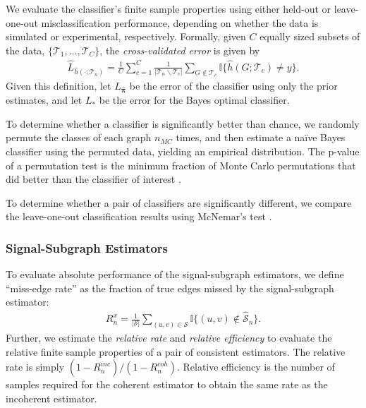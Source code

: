 \documentclass[10pt,journal,cspaper,compsoc]{IEEEtran}
\newcommand{\II}{\mathbb{I}}           %
\providecommand{\mc}[1]{\mathcal{#1}}
\providecommand{\wh}[1]{\widehat{#1}}
\providecommand{\mhc}[1]{\widehat{\mathcal{#1}}}
\providecommand{\mhb}[1]{\hat{\boldsymbol{#1}}}
\begin{document}
We evaluate the classifier's finite sample properties using either held-out or leave-one-out misclassification performance, depending on whether the data is simulated or experimental, respectively.  Formally, given $C$ equally sized subsets of the data, $\{\mc{T}_{1}, \ldots, \mc{T}_{C}\}$, the \emph{cross-validated error} is given by
\begin{align} \label{eq:L2}
	\wh{L}_{\wh{h}(\cdot; \mc{T}_n)} = \frac{1}{C}\sum_{c=1}^C \frac{1}{|\mc{T}_n \backslash \mc{T}_c|}\sum_{G \notin \mc{T}_c} \II\{\wh{h}(G; \mc{T}_{c}) \neq y\}.
\end{align}
Given this definition, let $L_{\mhb{\pi}}$ be the error of the classifier using only the prior estimates, and let $L_*$ be the error for the Bayes optimal classifier.  

To determine whether a classifier is significantly better than chance, we randomly permute the classes of each graph $n_{MC}$ times, and then estimate a na\"ive Bayes classifier using the permuted data, yielding an empirical distribution.  The p-value of a permutation test is the minimum fraction of Monte Carlo permutations that did better than the classifier of interest \cite{Good2010}.  

To determine whether a pair of classifiers are significantly different, we compare the leave-one-out classification results using McNemar's test \cite{McNemar1947}.


\subsubsection{Signal-Subgraph Estimators} %
\label{ssub:signal_subgraph_estimators}


To evaluate absolute performance of the signal-subgraph estimators, we define  ``miss-edge rate'' as the fraction of true edges missed by the signal-subgraph estimator:
\begin{align}
R^x_n = \frac{1}{|\mc{S}|} \sum_{(u,v)\in \mc{S}}\II\{(u,v) \notin \mhc{S}_n\}.
\end{align}
Further, we estimate the \emph{relative rate} and \emph{relative efficiency} to evaluate the relative finite sample properties of a pair of consistent estimators. The relative rate is simply $(1-R^{inc}_n)/(1-R^{coh}_n)$.  Relative efficiency is the number of samples required for the coherent estimator to obtain the same rate as the incoherent estimator.
\end{document}
